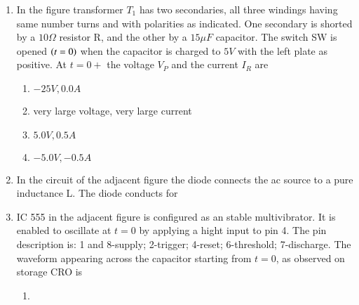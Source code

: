\documentclass[journal]{IEEEtran}
\numberwithin{equation}{enumi}
\numberwithin{figure}{enumi}
\begin{document}
\begin{enumerate}
    \item 
    In the figure transformer $T_1$ has two secondaries, all three windings having same number turns and with polarities as indicated. One secondary is shorted by a $10\Omega$ resistor R, and the other by a $15 \mu F$ capacitor. The switch SW is opened $\left(t = 0\right)$ when  the capacitor is charged to $5 V$ with the left plate as positive. At $t = 0+$ the voltage $V_P$ and the current $I_R$ are
    \begin{figure}[H]
        \centering
        \resizebox{0.5\textwidth}{!}{}
    \end{figure}
    \hfill{}
    \begin{enumerate}
        \item $-25V, 0.0A$
        \item very large voltage, very large current
        \item $5.0V, 0.5A$
        \item $-5.0V, -0.5A$
    \end{enumerate}

    \item 
    In the circuit of the adjacent figure the diode connects the ac source to a pure inductance L.
    The diode conducts for
    \begin{figure}[H]
    \centering
    \resizebox{0.3\textwidth}{!}{}
    \end{figure}
    \hfill{}
    \begin{enumerate}
    \end{enumerate}

    \item 
    IC 555 in the adjacent figure is configured as an stable multivibrator. It is enabled to oscillate at $t = 0$ by applying a hight input to pin 4. The pin description is: 1 and 8-supply; 2-trigger; 4-reset; 6-threshold; 7-discharge. The waveform appearing across the capacitor starting from $t = 0$, as observed on storage CRO is
    \begin{figure}[H]
        \centering
        \resizebox{0.3\textwidth}{!}{}
    \end{figure}
    \hfill{}
    \begin{multicols}{2}
    \begin{enumerate}
        \item 
        \begin{figure}[H]
        \centering
        \resizebox{0.25\textwidth}{!}{}
        \end{figure}


\end{enumerate}
\end{multicols}
\end{enumerate}
\end{document}
